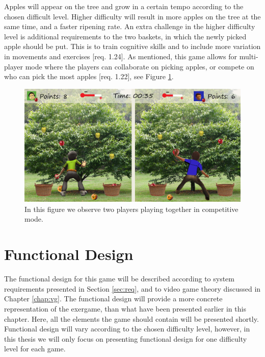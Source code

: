 Apples will appear on the tree and grow in a certain tempo according to the chosen difficult level. Higher difficulty will result in more apples on the tree at the same time, and a faster ripening rate. An extra challenge in the higher difficulty level is additional requirements to the two baskets, in which the newly picked apple should be put. This is to train cognitive skills and to include more variation in movements and exercises [req. 1.24]. As mentioned, this game allows for multi-player mode where the players can collaborate on picking apples, or compete on who can pick the most apples [req. 1.22], see Figure \ref{fig:appleMultiplayer}. 

\begin{figure} [H]
\centering
\includegraphics[scale=0.07]{gameapple2playerEngelsk.jpg}
\caption[Picking apples - multi-player]{In this figure we observe two players playing together in competitive mode.}
\label{fig:appleMultiplayer}
\end{figure}

\section{Functional Design}
\label{sec:functionaldesign}

The functional design for this game will be described according to system requirements presented in Section \ref{sec:req}, and to video game theory discussed in Chapter \ref{chap:vg}. The functional design will provide a more concrete representation of the exergame, than what have been presented earlier in this chapter. Here, all the elements the game should contain will be presented shortly. Functional design will vary according to the chosen difficulty level, however, in this thesis we will only focus on presenting functional design for one difficulty level for each game.

